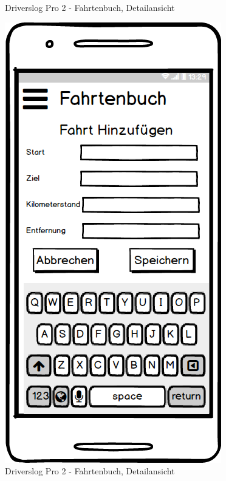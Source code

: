 \documentclass[a4paper]{article}
\begin{document}
\begin{figure}
\begin{minipage}[b]{0.3\textwidth}
        \caption{\label{img:img/mock5}Driverslog Pro 2 - Fahrtenbuch, Detailansicht}
    \end{minipage}
    \hspace{0.025\textwidth}%
	\begin{minipage}[b]{0.3\textwidth}
		\includegraphics[width=\textwidth]{img/mock6}
        \caption{\label{img:img/mock6}Driverslog Pro 2 - Fahrtenbuch, Detailansicht}
	\end{minipage}
\end{figure}
\end{document}
